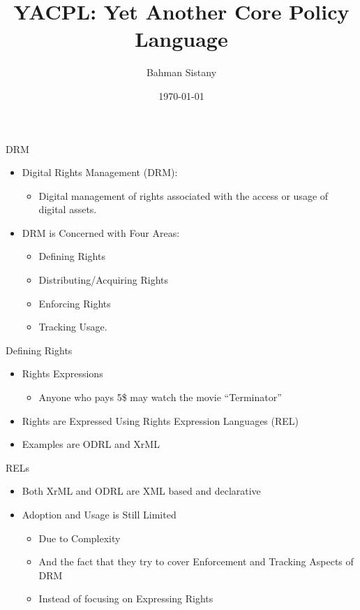 \documentclass{beamer}
\title{YACPL: Yet Another Core Policy Language}
\author{Bahman Sistany}
\date{\today}
\begin{document}
\begin{frame}
\titlepage
\end{frame}

\begin{frame}{DRM}
\begin{itemize}
   \item Digital Rights Management (DRM):
   \begin{itemize}
      \item Digital management of rights associated with the access or usage of digital assets.
   \end{itemize}

   \item DRM is Concerned with Four Areas:
     \begin{itemize}
	\item Defining Rights
	\item Distributing/Acquiring Rights
	\item Enforcing Rights
	\item Tracking Usage.
     \end{itemize}
\end{itemize}
\end{frame}
\begin{frame}[fragile]{Defining Rights}
\LARGE
\begin{itemize}
\item Rights Expressions
   \begin{itemize}
   \item Anyone who pays 5\$ may watch the movie ``Terminator''
   \end{itemize}
\item Rights are Expressed Using Rights Expression Languages (REL)
\item Examples are ODRL and XrML
\end{itemize}
\end{frame}
\begin{frame}[fragile]{RELs}
\LARGE
\begin{itemize}
\item Both XrML and ODRL are XML based and declarative
\item Adoption and Usage is Still Limited
   \begin{itemize}
   \item Due to Complexity 
   \item And the fact that they try to cover Enforcement and Tracking Aspects of DRM
   \item Instead of focusing on Expressing Rights
   \end{itemize}
\end{itemize}
\end{frame}
\end{document}

